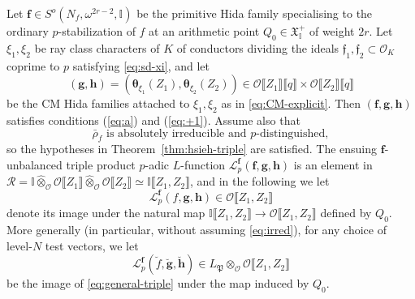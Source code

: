 \documentclass[10pt,letterpaper]{amsart}
\theoremstyle{plain}
\theoremstyle{definition}
\theoremstyle{definition}
\theoremstyle{plain}
\theoremstyle{plain}
\theoremstyle{plain}
\theoremstyle{remark}
\numberwithin{equation}{section}
\newcommand{\cc}{\mathbf{c}}
\newcommand{\ch}{\xi}
\def\cO{\mathcal O}
\newcommand{\unb}{{\boldsymbol{f}}}
\newcommand{\Q}{\mathbf{Q}}
\newcommand{\dBr}[1]{\llbracket{#1}\rrbracket}
\newcommand{\cR}{\mathbb{I}}
\newcommand{\bff}{{\boldsymbol{f}}}
\newcommand{\bfg}{{\boldsymbol{g}}}
\newcommand{\bfh}{{\boldsymbol{h}}}
\begin{document}
Let $\bff\in S^o(N_f,\omega^{2r-2},\cR)$ be the primitive Hida family specialising to the ordinary $p$-stabilization of $f$ at an arithmetic point $Q_0\in\mathfrak{X}_\cR^+$ of weight $2r$.  Let $\ch_1,\ch_2$ be ray class characters of $K$ of conductors dividing the ideals $\mathfrak{f}_1,\mathfrak{f}_2\subset\cO_K$ coprime to $p$  satisfying \eqref{eq:sd-xi}, and let
\begin{equation}\label{eq:gg*}
(\bfg,\bfh)=(\boldsymbol{\theta}_{\ch_1}(Z_1),\boldsymbol{\theta}_{\ch_2}(Z_2))\in\cO\dBr{Z_1}\dBr{q}\times\cO\dBr{Z_2}\dBr{q}
\end{equation}
be the CM Hida families %
attached to $\ch_1,\ch_2$ as in \eqref{eq:CM-explicit}. Then  $(\bff,\bfg,\bfh)$ satisfies conditions (\ref{eq:a}) and (\ref{eq:+1}). Assume also that  
\begin{equation}\label{eq:irred}
\textrm{$\bar{\rho}_f$ is absolutely irreducible and $p$-distinguished},\tag{irr-dist}
\end{equation}
so the hypotheses in Theorem~\ref{thm:hsieh-triple} are satisfied. The ensuing $\bff$-unbalanced triple product $p$-adic $L$-function $\mathscr{L}_p^{\bff}(\bff,\bfg,\bfh)$ is an element in $\mathcal{R}=\cR\hat\otimes_{\cO}\cO\dBr{Z_1}\hat\otimes_{\cO}\cO\dBr{Z_2}\simeq\cR\dBr{Z_1,Z_2}$, and in the following we let 
\begin{equation}\label{eq:triple-2var}
\mathscr{L}_p^{\unb}(f,\bfg,\bfh)\in\cO\dBr{Z_1,Z_2}
\end{equation}
denote its image  
under the natural map $\cR\dBr{Z_1,Z_2}\rightarrow\cO\dBr{Z_1,Z_2}$ defined by $Q_0$. %
More generally (in particular, without assuming \eqref{eq:irred}), for any choice of level-$N$ test vectors, we let
\begin{equation}\label{eq:genera-triple-2var}
\mathscr{L}_p^\bff(\breve{f},\breve{\bfg},\breve{\bfh})\in L_\mathfrak{P}\otimes_{\cO}\cO\dBr{Z_1,Z_2}
\end{equation}
be the image of \eqref{eq:general-triple} under the map induced by $Q_0$.
\end{document}
